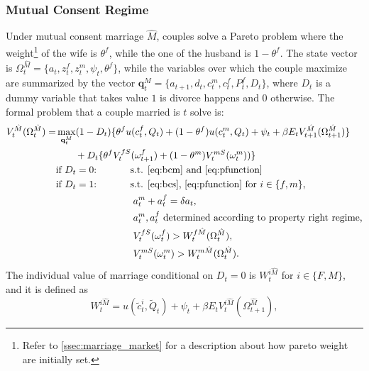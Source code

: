 \documentclass[12pt]{article}
\numberwithin{table}{section}
\begin{document}
\subsubsection*{Mutual Consent Regime}
Under mutual consent marriage $\hat{M}$, couples solve a Pareto problem where the weight\footnote{Refer to \autoref{ssec:marriage_market} for a description about how pareto weight are initially set.} of the wife is $\theta^f$, while the one of the husband is $1-\theta^f$. The state vector is $\Omega^{\hat{M}}_t=\{a_t,z^f_t,z^m_t,\psi_t,\theta^f\}$, while the variables over which the couple maximize are summarized by the vector $\mathbf{q}^M_t=\{a_{t+1},d_{t},c^m_{t},c^f_{t},P^f_t,D_t\}$, where $D_t$ is a dummy variable that takes value $1$ is divorce happens and $0$ otherwise. The formal problem that a couple married is $t$ solve is:
\begin{equation}\label{eq:v_mutual}
\begin{split}
V_t^{\hat{M}}(\Omega^{\hat{M}}_t)=&\max_{\mathbf{q}^M_t} (1-D_t)\{\theta^f u(c^f_t,Q_t)+(1-\theta^f)u(c^m_t,Q_t)+\psi_t+\beta E_t V^{\hat{M}}_{t+1}(\Omega^{\hat{M}}_{t+1})\}\\ &\quad\quad+D_t \{\theta^fV^{fS}_{t}(\omega^{f}_{t+1})+(1-\theta^m)  V^{mS}_{t}(\omega^{m}_{t}))\}
\\ &\text{if $D_t=0$:}\hspace{35pt}\text{s.t. \eqref{eq:bcm} and \eqref{eq:pfunction}
}
\\ &\text{if $D_t=1$:}\hspace{35pt}\text{s.t. \eqref{eq:bcs}, \eqref{eq:pfunction} for $i\in\{f,m\}$,}\\ &
\hspace{80pt}a_t^m+a_t^f=\delta a_t,	\\ &
\hspace{80pt}a_t^m,a_t^f\text{ determined according to property right regime,}	\\ &\hspace{80pt}
V_{t}^{fS}(\omega^f_{t})> W^{f\hat{M}}_{t}(\Omega^{\hat{M}}_{t}),\\ &\hspace{80pt}
V_{t}^{mS}(\omega^m_{t})> W^{m\hat{M}}_{t}(\Omega^{\hat{M}}_{t}).
\end{split}
\end{equation}
The individual value of marriage conditional on $D_t=0$ is $W_{t}^{i\hat{M}}$ for $i\in\{F,M\}$, and it is defined as 
\begin{equation}
W_{t}^{i\hat{M}}=u(\tilde{c}_t^{i},\tilde{Q}_t)+\psi_t+\beta E_t V_{t}^{i\hat{M}}(\Omega^{\hat{M}}_{t+1}),
\end{equation}
\end{document}
